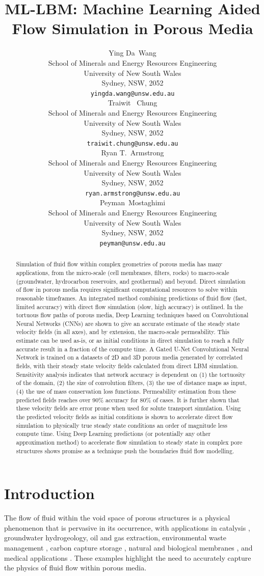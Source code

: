 \documentclass{article}
\title{ML-LBM: Machine Learning Aided Flow Simulation in Porous Media}
\author{
  Ying Da~Wang \\
  School of Minerals and Energy Resources Engineering\\
  University of New South Wales\\
  Sydney, NSW, 2052 \\
  \texttt{yingda.wang@unsw.edu.au} \\
  \And
  Traiwit ~Chung \\
  School of Minerals and Energy Resources Engineering\\
  University of New South Wales\\
  Sydney, NSW, 2052 \\
  \texttt{traiwit.chung@unsw.edu.au} \\
  \And
  Ryan T.~Armstrong \\
  School of Minerals and Energy Resources Engineering\\
  University of New South Wales\\
  Sydney, NSW, 2052 \\
  \texttt{ryan.armstrong@unsw.edu.au} \\
  \And
  Peyman~Mostaghimi \\
  School of Minerals and Energy Resources Engineering\\
  University of New South Wales\\
  Sydney, NSW, 2052 \\
  \texttt{peyman@unsw.edu.au} \\
}
\begin{document}
\maketitle


\begin{abstract}
Simulation of fluid flow within complex geometries of porous media has many applications, from the micro-scale (cell membranes, filters, rocks) to macro-scale (groundwater, hydrocarbon reservoirs, and geothermal) and beyond. Direct simulation of flow in porous media requires significant computational resources to solve within reasonable timeframes. An integrated method combining predictions of fluid flow (fast, limited accuracy) with direct flow simulation (slow, high accuracy) is outlined. In the tortuous flow paths of porous media, Deep Learning techniques based on Convolutional Neural Networks (CNNs) are shown to give an accurate estimate of the steady state velocity fields (in all axes), and by extension, the macro-scale permeability. This estimate can be used as-is, or as initial conditions in direct simulation to reach a fully accurate result in a fraction of the compute time. A Gated U-Net Convolutional Neural Network is trained on a datasets of 2D and 3D porous media generated by correlated fields, with their steady state velocity fields calculated from direct LBM simulation. Sensitivity analysis indicates that network accuracy is dependent on (1) the tortuosity of the domain, (2) the size of convolution filters, (3) the use of distance maps as input, (4) the use of mass conservation loss functions. Permeability estimation from these predicted fields reaches over 90\% accuracy for 80\% of cases. It is further shown that these velocity fields are error prone when used for solute transport simulation. Using the predicted velocity fields as initial conditions is shown to accelerate direct flow simulation to physically true steady state conditions an order of magnitude less compute time. Using Deep Learning predictions (or potentially any other approximation method) to accelerate flow simulation to steady state in complex pore structures shows promise as a technique push the boundaries fluid flow modelling.
\end{abstract}

\pagebreak
\section{Introduction}
\label{sec:intro}
The flow of fluid within the void space of porous structures is a physical phenomenon that is pervasive in its occurrence, with applications in catalysis \cite{catalysis}, groundwater hydrogeology, oil and gas extraction, environmental waste management \cite{FENWICK1998121,HILPERT2001243,BLUNT20021069,CULLIGAN2006227,mostaghimi2010quantitative, Mostaghimi2016,blunt2017multiphase}, carbon capture storage \cite{BLUNT2013197}, natural and biological membranes \cite{GRUBER2011488}, and medical applications \cite{khanafer2012role}. These examples highlight the need to accurately capture the physics of fluid flow within porous media.
\end{document}
